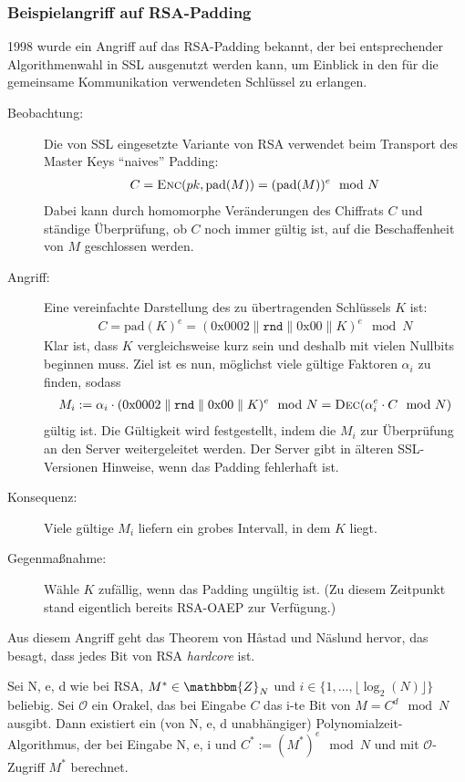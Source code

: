 \subsubsection{Beispielangriff auf RSA-Padding}
1998 wurde ein Angriff auf das RSA-Padding bekannt, der bei entsprechender Algorithmenwahl in SSL ausgenutzt werden kann, um Einblick
in den für die gemeinsame Kommunikation verwendeten Schlüssel zu erlangen.
\begin{description}
	\item[Beobachtung:] Die von SSL eingesetzte Variante von RSA verwendet beim Transport des Master Keys "`naives"' Padding:
		\begin{align*}
		C = \textsc{Enc}(pk, \text{pad}(M)) = (\text{pad}(M))^e \mod N
		\end{align*}
		Dabei kann durch homomorphe Veränderungen des Chiffrats $C$ und ständige Überprüfung, ob $C$ noch immer gültig ist, auf die
		Beschaffenheit von $M$ geschlossen werden.
	\item[Angriff:] Eine vereinfachte Darstellung des zu übertragenden Schlüssels $K$ ist:
		\begin{align*}
		C = \text{pad}(K)^e = (0\mathrm{x}0002 \parallel \mathtt{rnd} \parallel 0\mathrm{x}00 \parallel K)^e \mod N
		\end{align*}
		Klar ist, dass $K$ vergleichsweise kurz sein und deshalb mit vielen Nullbits beginnen muss. Ziel ist es nun, möglichst viele gültige Faktoren
		$\alpha_i$ zu finden, sodass 
		\begin{align*}
		M_i := \alpha_i \cdot (0\mathrm{x}0002 \parallel \mathtt{rnd} \parallel 0\mathrm{x}00 \parallel K)^e \mod N = \textsc{Dec}(\alpha_i^e \cdot C \mod
		N)
		\end{align*}
		gültig ist. Die Gültigkeit wird festgestellt, indem die $M_i$ zur Überprüfung an den Server weitergeleitet werden. Der Server gibt in
		älteren SSL-Versionen Hinweise, wenn das Padding fehlerhaft ist.
	\item[Konsequenz:] Viele gültige $M_i$ liefern ein grobes Intervall, in dem $K$ liegt.
	\item[Gegenmaßnahme:] Wähle $K$ zufällig, wenn das Padding ungültig ist. (Zu diesem Zeitpunkt stand eigentlich bereits RSA-OAEP zur Verfügung.)
\end{description}
Aus diesem Angriff geht das Theorem von Håstad und Näslund hervor, das besagt, dass jedes Bit von RSA \emph{hardcore} ist.~\\
\begin{theorem}
Sei N, e, d wie bei RSA, $M^* \in \mathbbm{Z}_N$ und $i \in \{1, \ldots , \lfloor \log_2(N)\rfloor \}$ beliebig. Sei $\mathcal{O}$ ein
Orakel, das bei Eingabe $C$ das i-te Bit von $M = C^d \mod N$ ausgibt. Dann existiert ein (von N, e, d unabhängiger)
Polynomialzeit-Algorithmus, der bei Eingabe N, e, i und $C^* := (M^*)^e \mod N$ und mit $\mathcal{O}$-Zugriff $M^*$ berechnet.
\end{theorem}


